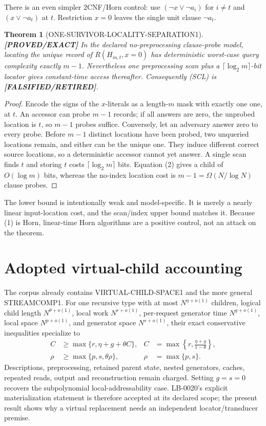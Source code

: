 \documentclass[11pt]{article}
\newtheorem{theorem}{Theorem}
\newcommand{\status}[1]{\textbf{[#1]}}
\begin{document}
There is an even simpler 2CNF/Horn control: use
$(\neg x\vee\neg a_i)$ for $i\ne t$ and $(x\vee\neg a_t)$ at $t$.
Restriction $x=0$ leaves the single unit clause $\neg a_t$.

\begin{theorem}[ONE-SURVIVOR-LOCALITY-SEPARATION1]
\status{PROVED/EXACT} In the declared no-preprocessing clause-probe model,
locating the unique record of $R(H_{m,t},x=0)$ has deterministic worst-case
query complexity exactly $m-1$.  Nevertheless one preprocessing scan plus a
$\lceil\log_2m\rceil$-bit locator gives constant-time access thereafter.
Consequently (SCL) is \status{FALSIFIED/RETIRED}.
\end{theorem}

\begin{proof}
Encode the signs of the $x$-literals as a length-$m$ mask with exactly one
one, at $t$.  An accessor can probe $m-1$ records; if all answers are zero,
the unprobed location is $t$, so $m-1$ probes suffice.  Conversely, let an
adversary answer zero to every probe.  Before $m-1$ distinct locations have
been probed, two unqueried locations remain, and either can be the unique one.
They induce different correct source locations, so a deterministic accessor
cannot yet answer.  A single scan finds $t$ and storing $t$ costs
$\lceil\log_2m\rceil$ bits.  Equation (2) gives a child of $O(\log m)$ bits,
whereas the no-index location cost is $m-1=\Omega(N/\log N)$ clause probes.
\end{proof}

The lower bound is intentionally weak and model-specific.  It is merely a
nearly linear input-location cost, and the scan/index upper bound matches it.
Because (1) is Horn, linear-time Horn algorithms are a positive control, not
an attack on the theorem.

\section{Adopted virtual-child accounting}

The corpus already contains VIRTUAL-CHILD-SPACE1 and the more general
STREAMCOMP1.  For one recursive type with at most
$N^{\eta+o(1)}$ children, logical child length
$N^{\theta+o(1)}$, local work $N^{r+o(1)}$, per-request generator time
$N^{g+o(1)}$, local space $N^{p+o(1)}$, and generator space
$N^{s+o(1)}$, their exact conservative inequalities specialize to
\begin{align}
C&\ge\max\{r,\eta+g+\theta C\},
& C&=\max\left\{r,\frac{\eta+g}{1-\theta}\right\},\tag{3}\\
\rho&\ge\max\{p,s,\theta\rho\},
& \rho&=\max\{p,s\}.\tag{4}
\end{align}
Descriptions, preprocessing, retained parent state, nested generators,
caches, repeated reads, output and reconstruction remain charged.  Setting
$g=s=0$ recovers the subpolynomial local-addressability case.  LB-0020's
explicit materialization statement is therefore accepted at its declared
scope; the present result shows why a virtual replacement needs an
independent locator/transducer premise.
\end{document}
